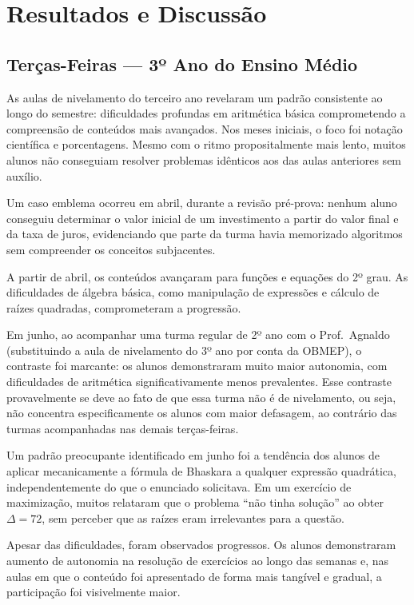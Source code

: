 \documentclass[11pt]{article}
\begin{document}
\section{Resultados e Discussão}

\subsection{Terças-Feiras --- 3º Ano do Ensino Médio}

As aulas de nivelamento do terceiro ano revelaram um padrão consistente ao longo do semestre: dificuldades profundas em aritmética básica comprometendo a compreensão de conteúdos mais avançados. Nos meses iniciais, o foco foi notação científica e porcentagens. Mesmo com o ritmo propositalmente mais lento, muitos alunos não conseguiam resolver problemas idênticos aos das aulas anteriores sem auxílio.

Um caso emblema ocorreu em abril, durante a revisão pré-prova: nenhum aluno conseguiu determinar o valor inicial de um investimento a partir do valor final e da taxa de juros, evidenciando que parte da turma havia memorizado algoritmos sem compreender os conceitos subjacentes.

A partir de abril, os conteúdos avançaram para funções e equações do 2º grau. As dificuldades de álgebra básica, como manipulação de expressões e cálculo de raízes quadradas, comprometeram a progressão. 

Em junho, ao acompanhar uma turma regular de 2º ano com o Prof.\ Agnaldo (substituindo a aula de nivelamento do 3º ano por conta da OBMEP), o contraste foi marcante: os alunos demonstraram muito maior autonomia, com dificuldades de aritmética significativamente menos prevalentes. Esse contraste provavelmente se deve ao fato de que essa turma não é de nivelamento, ou seja, não concentra especificamente os alunos com maior defasagem, ao contrário das turmas acompanhadas nas demais terças-feiras.

Um padrão preocupante identificado em junho foi a tendência dos alunos de aplicar mecanicamente a fórmula de Bhaskara a qualquer expressão quadrática, independentemente do que o enunciado solicitava. Em um exercício de maximização, muitos relataram que o problema ``não tinha solução'' ao obter \(\Delta = 72\), sem perceber que as raízes eram irrelevantes para a questão.

Apesar das dificuldades, foram observados progressos. Os alunos demonstraram aumento de autonomia na resolução de exercícios ao longo das semanas e, nas aulas em que o conteúdo foi apresentado de forma mais tangível e gradual, a participação foi visivelmente maior.
\end{document}
